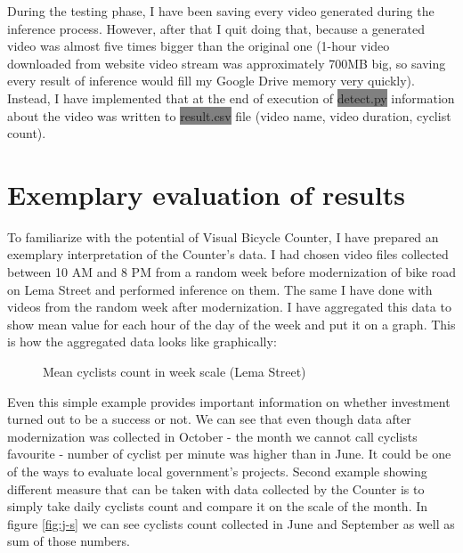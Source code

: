 During the testing phase, I have been saving every video generated during the inference process. However, after that I quit doing that, because a generated video was almost five times bigger than the original one (1-hour video downloaded from website video stream was approximately 700MB big, so saving every result of inference would fill my Google Drive memory very quickly). Instead, I have implemented that at the end of execution of \colorbox{Gray}{detect.py} information about the video was written to \colorbox{Gray}{result.csv} file (video name, video duration, cyclist count).
\section{Exemplary evaluation of results}
\label{sec:results}
To familiarize with the potential of Visual Bicycle Counter, I have prepared an exemplary interpretation of the Counter's data. I had chosen video files collected between 10 AM and 8 PM from a random week before modernization of bike road on Lema Street and performed inference on them. The same I have done with videos from the random week after modernization. I have aggregated this data to show mean value for each hour of the day of the week and put it on a graph. This is how the aggregated data looks like graphically:
\begin{figure}[h]
    \centering
    \caption{Mean cyclists count in week scale (Lema Street)}
    \label{fig:graph}
\end{figure}
\newline Even this simple example provides important information on whether investment turned out to be a success or not. We can see that even though data after modernization was collected in October - the month we cannot call cyclists favourite - number of cyclist per minute was higher than in June. It could be one of the ways to evaluate local government's projects. Second example showing different measure that can be taken with data collected by the Counter is to simply take daily cyclists count and compare it on the scale of the month. In figure \ref{fig:j-s} we can see cyclists count collected in June and September as well as sum of those numbers.
